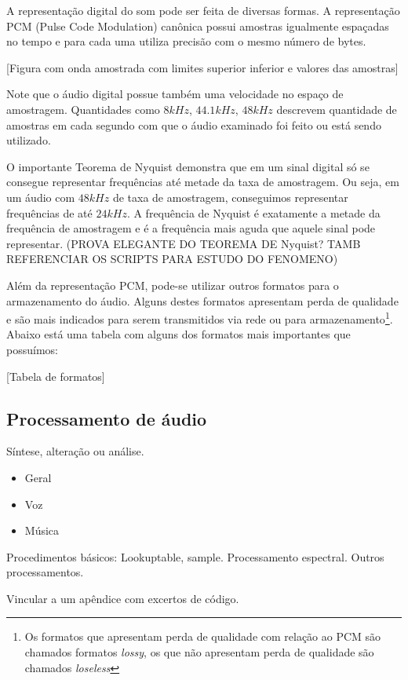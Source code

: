 A representação digital do som pode ser feita de diversas formas.
A representação PCM (Pulse Code Modulation) canônica possui amostras
igualmente espaçadas no tempo e para cada uma utiliza precisão com o mesmo
número de bytes.

[Figura com onda amostrada com limites superior inferior e valores das amostras]

Note que o áudio digital possue também uma velocidade no espaço de amostragem.
Quantidades como $8kHz$, $44.1kHz$, $48kHz$
descrevem quantidade de amostras em cada segundo com que o áudio examinado foi feito ou
está sendo utilizado.

O importante Teorema de Nyquist demonstra que em um sinal digital só se consegue representar
frequências até metade da taxa de amostragem. Ou seja, em um áudio com $48kHz$ de taxa de amostragem,
conseguimos representar frequências de até $24kHz$. A frequência de Nyquist é exatamente a metade
da frequência de amostragem e é a frequência mais aguda que aquele sinal pode representar.
(PROVA ELEGANTE DO TEOREMA DE Nyquist? TAMB REFERENCIAR OS SCRIPTS PARA ESTUDO DO FENOMENO)

Além da representação PCM, pode-se utilizar outros formatos para o armazenamento do áudio. Alguns
destes formatos apresentam perda de qualidade e são mais indicados para serem transmitidos via rede ou
para armazenamento\footnote{Os formatos que apresentam perda de qualidade com relação
ao PCM são chamados formatos \emph{lossy}, os que não apresentam perda de qualidade
são chamados \emph{loseless}}. Abaixo está uma tabela com alguns dos formatos mais importantes que possuímos:

[Tabela de formatos]


\subsection{Processamento de áudio}

Síntese, alteração ou análise.

\begin{itemize}
    \item Geral
    \item Voz
    \item Música
\end{itemize}

Procedimentos básicos: Lookuptable, sample. Processamento
espectral. Outros processamentos.

Vincular a um apêndice com excertos de código.

